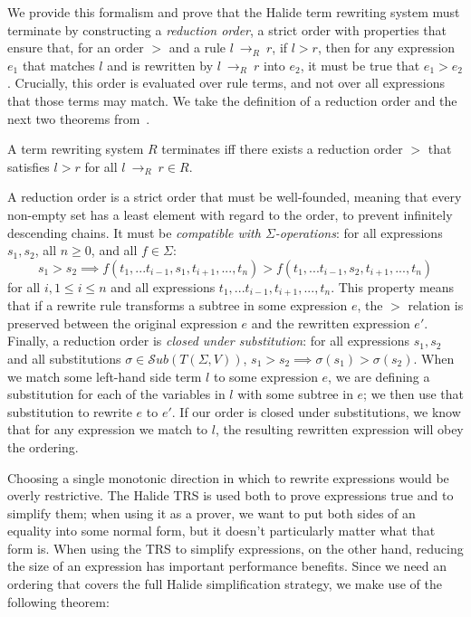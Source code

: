 \documentclass[acmsmall,review]{acmart}\settopmatter{printfolios=true,printccs=false,printacmref=false}
\newcommand{\rewrites}[0]{\:\rightarrow_{R}\:}
\begin{document}
We provide this formalism and prove that the Halide term rewriting system must terminate by constructing a \emph{reduction order}, a strict order with properties that ensure that, for an order $>$ and a rule $l \rewrites r$, if $l > r$, then for any expression $e_1$ that matches $l$ and is rewritten by $l \rewrites r$ into $e_2$, it must be true that $e_1 > e_2$. Crucially, this order is evaluated over rule terms, and not over all expressions that those terms may match. We take the definition of a reduction order and the next two theorems from~\citet{baader1999term}.

\begin{theorem}\label{theorem:terminates}
A term rewriting system $R$ terminates iff there exists a reduction order $>$ that satisfies $l > r$ for all $l \rewrites r \in R$.
\end{theorem}

A reduction order is a strict order that must be well-founded, meaning that every non-empty set has a least element with regard to the order, to prevent infinitely descending chains. It must be \emph{compatible with $\Sigma$-operations}: for all expressions $s_1, s_2$, all $n \geq 0$, and all $f \in \Sigma$:
\[
s_1 > s_2 \implies f(t_1,...t_{i-1},s_1,t_{i+1},...,t_n) > f(t_1,...t_{i-1},s_2,t_{i+1},...,t_n)
\]
for all $i, 1 \leq i \leq n$ and all expressions $t_1,...t_{i-1},t_{i+1},...,t_n$. This property means that if a rewrite rule transforms a subtree in some expression $e$, the $>$ relation is preserved between the original expression $e$ and the rewritten expression $e'$. Finally, a reduction order is \emph{closed under substitution}: for all expressions $s_1, s_2$ and all substitutions $\sigma \in \mathcal{S}ub(T(\Sigma,V))$, 
$s_1 > s_2 \implies \sigma(s_1) > \sigma(s_2)$. When we match some left-hand side term $l$ to some expression $e$, we are defining a substitution for each of the variables in $l$ with some subtree in $e$; we then use that substitution to rewrite $e$ to $e'$. If our order is closed under substitutions, we know that for any expression we match to $l$, the resulting rewritten expression will obey the ordering.

Choosing a single monotonic direction in which to rewrite expressions would be overly restrictive. 
The Halide TRS is used both to prove expressions true and to simplify them; when using it as a prover, we want to put both sides of an equality into some normal form, but it doesn't particularly matter what that form is. When using the TRS to simplify expressions, on the other hand, reducing the size of an expression has important performance benefits. Since we need an ordering that covers the full Halide simplification strategy, we make use of the following theorem:
\end{document}
